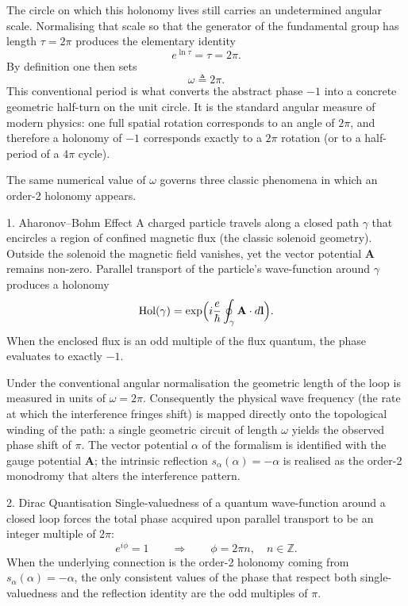 The circle on which this holonomy lives still carries an undetermined angular scale. Normalising that scale so that the generator of the fundamental group has length \(\tau=2\pi\) produces the elementary identity  
\[
e^{\ln\tau}=\tau=2\pi.
\]  
By definition one then sets  
\[
\omega\triangleq 2\pi.
\]  
This conventional period is what converts the abstract phase \(-1\) into a concrete geometric half-turn on the unit circle. It is the standard angular measure of modern physics: one full spatial rotation corresponds to an angle of \(2\pi\), and therefore a holonomy of \(-1\) corresponds exactly to a \(2\pi\) rotation (or to a half-period of a \(4\pi\) cycle).  

The same numerical value of \(\omega\) governs three classic phenomena in which an order-2 holonomy appears.

1. Aharonov–Bohm Effect
A charged particle travels along a closed path \(\gamma\) that encircles a region of confined magnetic flux (the classic solenoid geometry). Outside the solenoid the magnetic field vanishes, yet the vector potential \(\mathbf{A}\) remains non-zero. Parallel transport of the particle’s wave-function around \(\gamma\) produces a holonomy  
\[
\operatorname{Hol}(\gamma)=\exp\Bigl(i\frac{e}{\hbar}\oint_\gamma\mathbf{A}\cdot d\mathbf{l}\Bigr).
\]  
When the enclosed flux is an odd multiple of the flux quantum, the phase evaluates to exactly \(-1\).  

Under the conventional angular normalisation the geometric length of the loop is measured in units of \(\omega=2\pi\). Consequently the physical wave frequency (the rate at which the interference fringes shift) is mapped directly onto the topological winding of the path: a single geometric circuit of length \(\omega\) yields the observed phase shift of \(\pi\). The vector potential \(\alpha\) of the formalism is identified with the gauge potential \(\mathbf{A}\); the intrinsic reflection \(s_\alpha(\alpha)=-\alpha\) is realised as the order-2 monodromy that alters the interference pattern.

2. Dirac Quantisation
Single-valuedness of a quantum wave-function around a closed loop forces the total phase acquired upon parallel transport to be an integer multiple of \(2\pi\):  
\[
e^{i\phi}=1\qquad\Rightarrow\qquad\phi=2\pi n,\quad n\in\mathbb{Z}.
\]  
When the underlying connection is the order-2 holonomy coming from \(s_\alpha(\alpha)=-\alpha\), the only consistent values of the phase that respect both single-valuedness and the reflection identity are the odd multiples of \(\pi\).  

